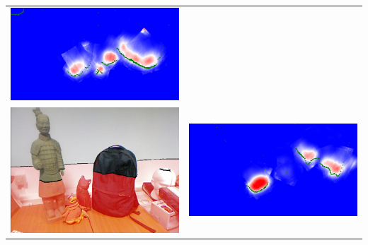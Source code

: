 \documentclass[10pt,onecolumn,letterpaper]{article}
\begin{document}
\begin{tabular}{cc}
\includegraphics[height=\imheight]{real/statue/slice_00080.jpg} \\
\includegraphics[height=\imheight]{real/statue/rgb_00110.jpg} &
\includegraphics[height=\imheight]{real/statue/slice_00110.jpg} \\

\end{tabular}
\end{document}
